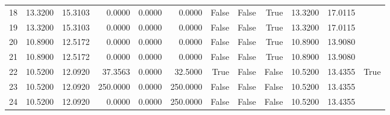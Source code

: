\begin{tabular}{rrrrrrrrrrrl}
18 & 13.3200 & 15.3103 & 0.0000 & 0.0000 & 0.0000 & False & False & True & 13.3200 & 17.0115 &  \\
19 & 13.3200 & 15.3103 & 0.0000 & 0.0000 & 0.0000 & False & False & True & 13.3200 & 17.0115 &  \\
20 & 10.8900 & 12.5172 & 0.0000 & 0.0000 & 0.0000 & False & False & True & 10.8900 & 13.9080 &  \\
21 & 10.8900 & 12.5172 & 0.0000 & 0.0000 & 0.0000 & False & False & True & 10.8900 & 13.9080 &  \\
22 & 10.5200 & 12.0920 & 37.3563 & 0.0000 & 32.5000 & True & False & False & 10.5200 & 13.4355 & True \\
23 & 10.5200 & 12.0920 & 250.0000 & 0.0000 & 250.0000 & False & False & False & 10.5200 & 13.4355 &  \\
24 & 10.5200 & 12.0920 & 0.0000 & 0.0000 & 250.0000 & False & False & False & 10.5200 & 13.4355 &  \\
\bottomrule
\end{tabular}
